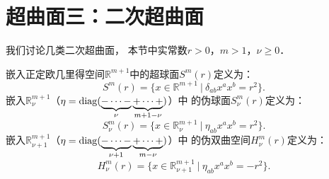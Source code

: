 
\section{超曲面三：二次超曲面}\label{chsm:sec_Hyperquadric}

我们讨论几类二次超曲面\cite[p.108]{oneill1983}，
本节中实常数$r>0$，$m>1$，$\nu \geqslant 0$．


嵌入正定欧几里得空间$\mathbb{R}^{m+1}$中的{\heiti 超球面}$S^m(r)$定义为：
\begin{equation}\label{chsm:eqn_hpsphere}
    S^m(r) = \{x\in\mathbb{R}^{m+1} \ |\ \delta_{ab} x^a x^b = r^2 \} .
\end{equation}
嵌入$\mathbb{R}^{m+1}_\nu$（$\eta={\rm diag}(\underbrace{-\cdots-}_\nu \underbrace{+\cdots+}_{m+1-\nu})$）中
的{\heiti 伪球面}$S^m_\nu(r)$定义为：
\begin{equation}\label{chsm:eqn_pseudo-sphere}
    S^m_\nu(r) = \{x\in\mathbb{R}^{m+1}_\nu \ |\ \eta_{ab} x^a x^b = r^2 \} .
\end{equation}
嵌入$\mathbb{R}^{m+1}_{\nu+1}$（$\eta={\rm diag}(\underbrace{-\cdots-}_{\nu+1} \underbrace{+\cdots+}_{m-\nu})$）中
的{\heiti 伪双曲空间}$H^m_{\nu}(r)$定义为：
\begin{equation}\label{chsm:eqn_pseudo-hyperbolic}
    H^m_{\nu}(r) = \{x\in\mathbb{R}^{m+1}_{\nu+1} \ |\ \eta_{ab} x^a x^b = -r^2 \} .
\end{equation}

